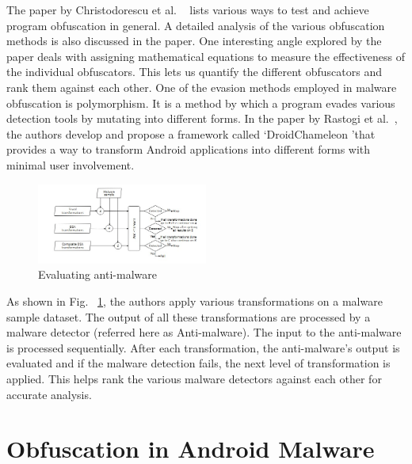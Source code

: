The paper by Christodorescu et al. ~\cite{Christodorescu} lists various ways to test and achieve program obfuscation in general. A detailed analysis of the various obfuscation methods is also discussed in the paper. One interesting angle explored by the paper deals with assigning mathematical equations to measure the effectiveness of the individual obfuscators. This lets us quantify the different obfuscators and rank them against each other.
One of the evasion methods employed in malware obfuscation is polymorphism. It is a method by which a program evades various detection tools by mutating into different forms. In the paper by Rastogi et al.~\cite{rastogi}, the authors develop and propose a framework called \textquoteleft DroidChameleon \textquoteright that provides a way to transform Android applications into different forms with minimal user involvement. 

\begin{figure}[htb]
	\centering
	\includegraphics[width=0.5\textwidth]{evalFigure1.jpg}
	\caption{Evaluating anti-malware} 
	\label{fig:eval}
\end{figure}

As shown in Fig. ~\ref{fig:eval}, the authors apply various transformations on a malware sample dataset. The output of all these transformations are processed by a malware detector (referred here as Anti-malware).  The input to the anti-malware is processed sequentially. After each transformation, the anti-malware’s output is evaluated and if the malware detection fails, the next level of transformation is applied. This helps rank the various malware detectors against each other for accurate analysis.

\section{Obfuscation in Android Malware}

